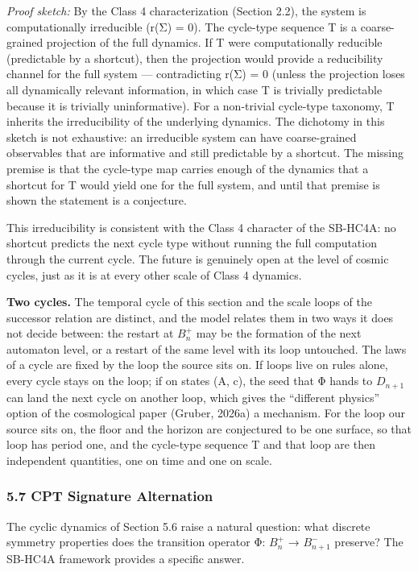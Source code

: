 \documentclass[
]{article}
\begin{document}
\emph{Proof sketch:} By the Class 4 characterization (Section 2.2), the
system is computationally irreducible (r(Σ) = 0). The cycle-type
sequence T is a coarse-grained projection of the full dynamics. If T
were computationally reducible (predictable by a shortcut), then the
projection would provide a reducibility channel for the full system ---
contradicting r(Σ) = 0 (unless the projection loses all dynamically
relevant information, in which case T is trivially predictable because
it is trivially uninformative). For a non-trivial cycle-type taxonomy, T
inherits the irreducibility of the underlying dynamics. The dichotomy in
this sketch is not exhaustive: an irreducible system can have
coarse-grained observables that are informative and still predictable by
a shortcut. The missing premise is that the cycle-type map carries
enough of the dynamics that a shortcut for T would yield one for the
full system, and until that premise is shown the statement is a
conjecture.

This irreducibility is consistent with the Class 4 character of the
SB-HC4A: no shortcut predicts the next cycle type without running the
full computation through the current cycle. The future is genuinely open
at the level of cosmic cycles, just as it is at every other scale of
Class 4 dynamics.

\textbf{Two cycles.} The temporal cycle of this section and the scale
loops of the successor relation are distinct, and the model relates them
in two ways it does not decide between: the restart at \(B_n^+\) may be
the formation of the next automaton level, or a restart of the same
level with its loop untouched. The laws of a cycle are fixed by the loop
the source sits on. If loops live on rules alone, every cycle stays on
the loop; if on states (A, c), the seed that Φ hands to \(D_{n+1}\) can
land the next cycle on another loop, which gives the ``different
physics'' option of the cosmological paper (Gruber, 2026a) a mechanism.
For the loop our source sits on, the floor and the horizon are
conjectured to be one surface, so that loop has period one, and the
cycle-type sequence T and that loop are then independent quantities, one
on time and one on scale.

\hypertarget{cpt-signature-alternation}{%
\subsubsection{5.7 CPT Signature
Alternation}\label{cpt-signature-alternation}}

The cyclic dynamics of Section 5.6 raise a natural question: what
discrete symmetry properties does the transition operator Φ: \(B_n^+\) →
\(B_{n+1}^-\) preserve? The SB-HC4A framework provides a specific
answer.
\end{document}
